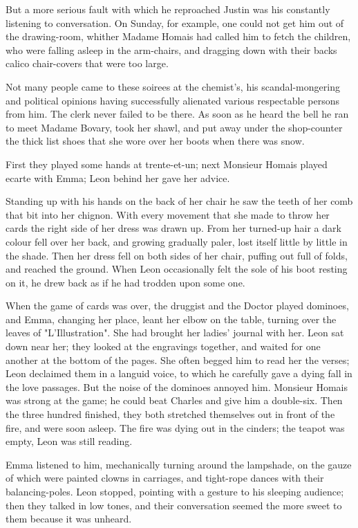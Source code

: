 \documentclass[11pt,twocolumn]{ltugboat}
\begin{document}
But a more serious fault with which he reproached Justin was his
constantly listening to conversation. On Sunday, for example, one could
not get him out of the drawing-room, whither Madame Homais had called
him to fetch the children, who were falling asleep in the arm-chairs,
and dragging down with their backs calico chair-covers that were too
large.

Not many people came to these soirees at the chemist's, his
scandal-mongering and political opinions having successfully alienated
various respectable persons from him. The clerk never failed to be
there. As soon as he heard the bell he ran to meet Madame Bovary, took
her shawl, and put away under the shop-counter the thick list shoes that
she wore over her boots when there was snow.

First they played some hands at trente-et-un; next Monsieur Homais
played ecarte with Emma; Leon behind her gave her advice.

Standing up with his hands on the back of her chair he saw the teeth of
her comb that bit into her chignon. With every movement that she made
to throw her cards the right side of her dress was drawn up. From her
turned-up hair a dark colour fell over her back, and growing gradually
paler, lost itself little by little in the shade. Then her dress fell
on both sides of her chair, puffing out full of folds, and reached the
ground. When Leon occasionally felt the sole of his boot resting on it,
he drew back as if he had trodden upon some one.

When the game of cards was over, the druggist and the Doctor played
dominoes, and Emma, changing her place, leant her elbow on the table,
turning over the leaves of "L'Illustration". She had brought her ladies'
journal with her. Leon sat down near her; they looked at the engravings
together, and waited for one another at the bottom of the pages. She
often begged him to read her the verses; Leon declaimed them in a
languid voice, to which he carefully gave a dying fall in the love
passages. But the noise of the dominoes annoyed him. Monsieur Homais
was strong at the game; he could beat Charles and give him a double-six.
Then the three hundred finished, they both stretched themselves out in
front of the fire, and were soon asleep. The fire was dying out in the
cinders; the teapot was empty, Leon was still reading.

Emma listened to him, mechanically turning around the lampshade, on the
gauze of which were painted clowns in carriages, and tight-rope dances
with their balancing-poles. Leon stopped, pointing with a gesture to his
sleeping audience; then they talked in low tones, and their conversation
seemed the more sweet to them because it was unheard.
\end{document}
